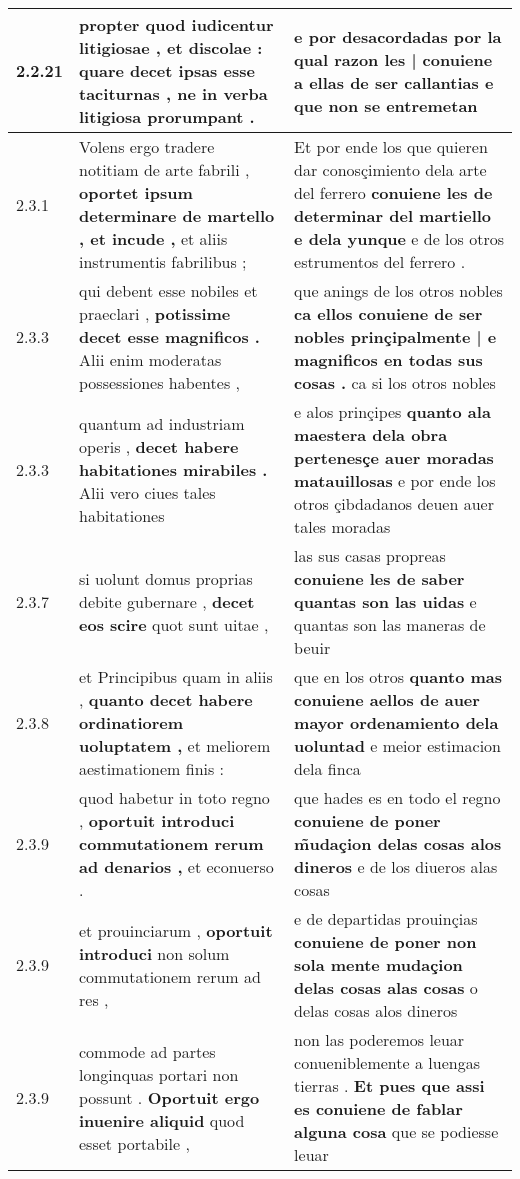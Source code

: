 \begin{tabular}{|p{1cm}|p{6.5cm}|p{6.5cm}|}
2.2.21 & propter quod iudicentur litigiosae , et discolae : \textbf{ quare decet ipsas esse taciturnas , } ne in verba litigiosa prorumpant . & e por desacordadas \textbf{ por la qual razon les | conuiene a ellas de ser callantias } e que non se entremetan \\\hline
2.3.1 & Volens ergo tradere notitiam de arte fabrili , \textbf{ oportet ipsum determinare de martello , et incude , } et aliis instrumentis fabrilibus ; & Et por ende los que quieren dar conosçimiento dela arte del ferrero \textbf{ conuiene les de determinar del martiello e dela yunque } e de los otros estrumentos del ferrero . \\\hline
2.3.3 & qui debent esse nobiles et praeclari , \textbf{ potissime decet esse magnificos . } Alii enim moderatas possessiones habentes , & que anings de los otros nobles \textbf{ ca ellos conuiene de ser nobles prinçipalmente | e magnificos en todas sus cosas . } ca si los otros nobles \\\hline
2.3.3 & quantum ad industriam operis , \textbf{ decet habere habitationes mirabiles . } Alii vero ciues tales habitationes & e alos prinçipes \textbf{ quanto ala maestera dela obra pertenesçe auer moradas matauillosas } e por ende los otros çibdadanos deuen auer tales moradas \\\hline
2.3.7 & si uolunt domus proprias debite gubernare , \textbf{ decet eos scire } quot sunt uitae , & las sus casas propreas \textbf{ conuiene les de saber quantas son las uidas } e quantas son las maneras de beuir \\\hline
2.3.8 & et Principibus quam in aliis , \textbf{ quanto decet habere ordinatiorem uoluptatem , } et meliorem aestimationem finis : & que en los otros \textbf{ quanto mas conuiene aellos de auer mayor ordenamiento dela uoluntad } e meior estimacion dela finca \\\hline
2.3.9 & quod habetur in toto regno , \textbf{ oportuit introduci commutationem rerum ad denarios , } et econuerso . & que hades es en todo el regno \textbf{ conuiene de poner m̃udaçion delas cosas alos dineros } e de los diueros alas cosas \\\hline
2.3.9 & et prouinciarum , \textbf{ oportuit introduci } non solum commutationem rerum ad res , & e de departidas prouinçias \textbf{ conuiene de poner non sola mente mudaçion delas cosas alas cosas } o delas cosas alos dineros \\\hline
2.3.9 & commode ad partes longinquas portari non possunt . \textbf{ Oportuit ergo inuenire aliquid } quod esset portabile , & non las poderemos leuar conueniblemente a luengas tierras . \textbf{ Et pues que assi es conuiene de fablar alguna cosa } que se podiesse leuar \\\hline

\end{tabular}
